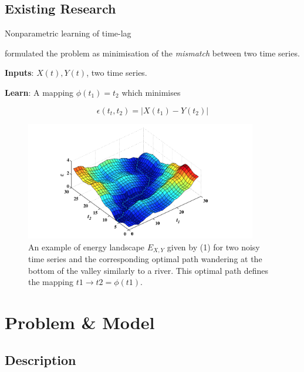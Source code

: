 \documentclass{beamer}
\begin{document}
\subsection{Existing Research}

\begin{frame}{Nonparametric learning of time-lag}

\cite{ZHOU2006195} formulated the problem as minimisation of the \emph{mismatch} between two time series.

\textbf{Inputs}: $X(t), Y(t)$, two time series.

\textbf{Learn}: A mapping $\phi(t_1) = t_2$ which minimises 

\begin{equation}
\epsilon(t_t, t_2) = |X(t_1) - Y(t_2)|
\end{equation}


\end{frame}

\begin{frame}
\begin{figure}[h]
        \includegraphics[width=0.90\textwidth]{polymer-alignment.png}
        \caption{An example of energy landscape $E_{X,Y}$ given by (1) for two noisy time series and the corresponding optimal path wandering at the bottom of the valley similarly to a river. This optimal path defines the mapping $t1 \rightarrow t2 = \phi(t1)$.}
        \label{fig:polymer}
\end{figure}
\end{frame}


\section{Problem \& Model}

\subsection{Description}
\end{document}
